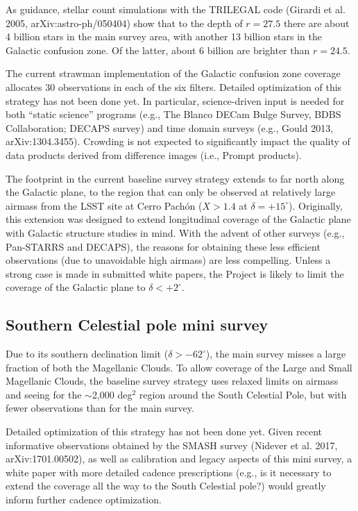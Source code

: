 \documentclass[DM,lsstdraft,toc,usenatbib]{lsstdoc}
\begin{document}
As guidance, stellar count simulations with the TRILEGAL code (Girardi et al. 2005, 
arXiv:astro-ph/050404) show that to the depth of $r=27.5$ there are about 4 billion
stars in the main survey area, with another 13 billion stars in the Galactic confusion 
zone. Of the latter, about 6 billion are brighter than $r=24.5$.  

The current strawman implementation of the Galactic confusion zone coverage allocates 
30 observations in each of the six filters. Detailed optimization of this strategy has not 
been done yet. In particular, science-driven input is needed for both ``static science''
programs (e.g., The Blanco DECam Bulge Survey, BDBS Collaboration; DECAPS survey) 
and  time domain surveys (e.g., Gould 2013, arXiv:1304.3455). Crowding is not expected to 
significantly impact the quality of data products derived from difference images (i.e., Prompt 
products).

The footprint in the current baseline survey strategy extends to far north along the Galactic
plane, to the region that can only be observed at relatively large airmass from the LSST
site at Cerro Pach\'on ($X>1.4$ at $\delta  = +15^\circ$). Originally, this extension was designed 
to extend longitudinal coverage of the Galactic plane with Galactic structure studies in mind. 
With the advent of other surveys (e.g., Pan-STARRS and DECAPS), the reasons for obtaining 
these less efficient observations (due to unavoidable high airmass) are less compelling. 
Unless a strong case is made in submitted white papers, the Project is likely to limit the 
coverage of the Galactic plane to $\delta < +2^\circ$. 


\subsection{Southern Celestial pole mini survey}

Due to its southern declination limit ($\delta > -62^\circ$), the main survey misses a large fraction
of both the Magellanic Clouds. To allow coverage of the Large and Small Magellanic Clouds, the 
baseline survey strategy uses relaxed limits on airmass and seeing for the $\sim$2,000 deg$^2$ region 
around the South Celestial Pole, but with fewer observations than for the main survey. 

Detailed optimization of this strategy has not been done yet. Given recent informative observations 
obtained by the SMASH survey (Nidever et al. 2017, arXiv:1701.00502), as well as calibration 
and legacy aspects of this mini survey, a white paper with more detailed cadence prescriptions
(e.g., is it necessary to extend the coverage all the way to the South Celestial pole?) would greatly 
inform further cadence optimization. 
\end{document}
